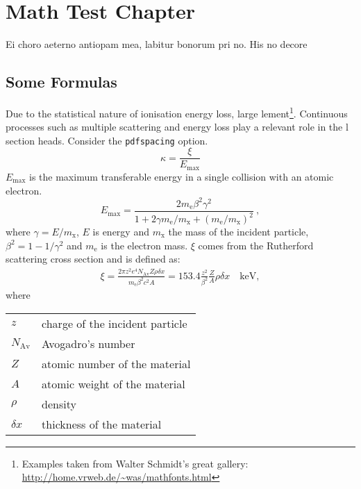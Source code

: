 \chapter{Math Test Chapter}\label{ch:mathtest} %
Ei choro aeterno antiopam mea, labitur bonorum pri no. His no decore

\section{Some Formulas}
Due to the statistical nature of ionisation energy loss, large
lement\footnote{Examples taken from Walter Schmidt's great gallery: \\
\url{http://home.vrweb.de/~was/mathfonts.html}}.  Continuous processes
such as multiple
scattering and energy loss play a relevant role in the l
section heads. Consider the \texttt{pdfspacing} option.
\begin{equation}
\kappa =\frac{\xi}{E_{\textrm{max}}} %
\end{equation}
$E_{\textrm{max}}$ is the maximum transferable energy in a single
collision with an atomic electron.
\[
E_{\textrm{max}} =\frac{2 m_{\textrm{e}} \beta^2\gamma^2 }{1 +
2\gamma m_{\textrm{e}}/m_{\textrm{x}} + \left ( m_{\textrm{e}}
/m_{\textrm{x}}\right)^2}\ ,
\]
where $\gamma = E/m_{\textrm{x}}$, $E$ is energy and
$m_{\textrm{x}}$ the mass of the incident particle,
$\beta^2 = 1 - 1/\gamma^2$ and $m_{\textrm{e}}$ is the electron mass.
$\xi$ comes from the Rutherford scattering cross section
and is defined as:
\begin{eqnarray*} \xi  = \frac{2\pi z^2 e^4 N_{\textrm{Av}} Z \rho
\delta x}{m_{\textrm{e}} \beta^2 c^2 A} =  153.4 \frac{z^2}{\beta^2}
\frac{Z}{A}
  \rho \delta x \quad\textrm{keV},
\end{eqnarray*}
where

\begin{tabular}{ll}
$z$          & charge of the incident particle \\
$N_{\textrm{Av}}$     & Avogadro's number \\
$Z$          & atomic number of the material \\
$A$          & atomic weight of the material \\
$\rho$       & density \\
$ \delta x$  & thickness of the material \\
\end{tabular}
